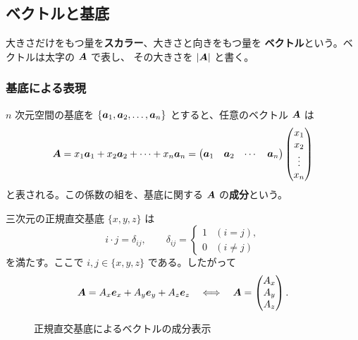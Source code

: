 \subsection{ベクトルと基底}

大きさだけをもつ量を\textbf{スカラー}、大きさと向きをもつ量を
\textbf{ベクトル}という。ベクトルは太字の $\bm{A}$ で表し、
その大きさを $|\bm{A}|$ と書く。

\subsubsection{基底による表現}

$n$ 次元空間の基底を $\{\bm{a}_1,\bm{a}_2,\ldots,\bm{a}_n\}$
とすると、任意のベクトル $\bm{A}$ は
\begin{equation}
  \bm{A}=x_1\bm{a}_1+x_2\bm{a}_2+\cdots+x_n\bm{a}_n
  =\begin{pmatrix}\bm{a}_1&\bm{a}_2&\cdots&\bm{a}_n\end{pmatrix}
   \begin{pmatrix}x_1\\x_2\\\vdots\\x_n\end{pmatrix}
\end{equation}
と表される。この係数の組を、基底に関する $\bm{A}$ の\textbf{成分}という。

三次元の正規直交基底 $\{\unit{x},\unit{y},\unit{z}\}$ は
\begin{equation}
  \unit{i}\cdot\unit{j}=\delta_{ij},\qquad
  \delta_{ij}=\begin{cases}1&(i=j),\\0&(i\ne j)\end{cases}
\end{equation}
を満たす。ここで $i,j\in\{x,y,z\}$ である。したがって
\begin{equation}
  \bm{A}=A_x\bm{e}_{x}+A_y\bm{e}_{y}+A_z\bm{e}_{z}
  \quad\Longleftrightarrow\quad
  \bm{A}=\begin{pmatrix}A_x\\A_y\\A_z\end{pmatrix}.
\end{equation}

\begin{figure}[htbp]
  \centering
  \caption{正規直交基底によるベクトルの成分表示}
\end{figure}

